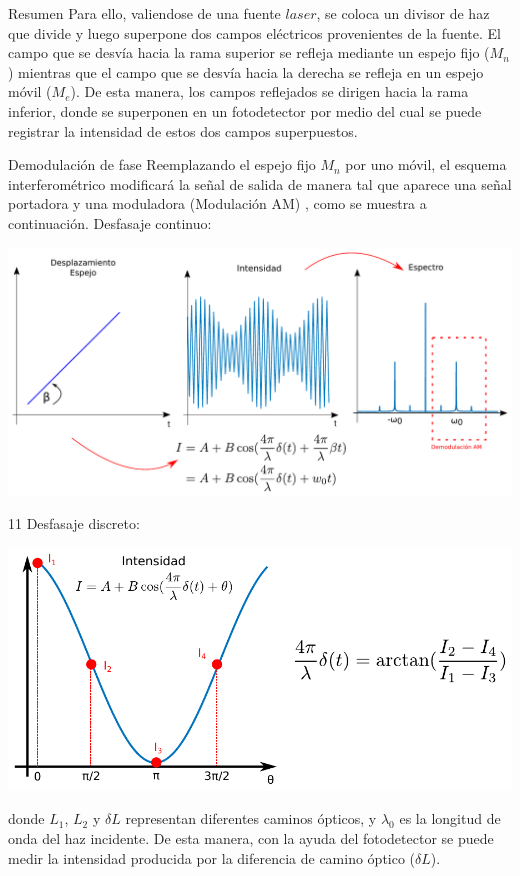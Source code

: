 \documentclass[mathserif]{beamer} %
\begin{document}
\begin{frame}
\begin{columns}[T]
\begin{column}{.475\linewidth}
\begin{block}{Resumen}
Para ello, valiendose de una fuente $laser$, se coloca un divisor de haz que divide y luego superpone dos campos eléctricos provenientes de la fuente. El campo que se desvía hacia la rama superior se refleja mediante un espejo fijo ($M_n$) mientras que el campo que se desvía hacia la derecha se refleja en un espejo móvil ($M_e$). De esta manera, los campos reflejados se dirigen hacia la rama inferior, donde se superponen en un fotodetector por medio del cual se puede registrar la intensidad de estos dos campos superpuestos.
      \end{block}
                 \vspace{-2ex}
                \begin{block}{Demodulación de fase}
                \justifying
   Reemplazando el espejo fijo $M_n$ por uno móvil, el esquema interferométrico modificará la señal de salida de manera tal que aparece una señal portadora y una moduladora (Modulación AM) , como se muestra a continuación.
Desfasaje continuo:
                      \begin{center}
                        \includegraphics[width=0.9\linewidth]{img/desfasaje_continuo.pdf}
                      \end{center}
                   11   \vspace{-1ex}
Desfasaje discreto:
\begin{center}
                        \includegraphics[width=0.9\linewidth]{img/desfasaje_discreto.pdf}
                      \end{center}
                  \justifying
                  donde $L_1$, $L_2$ y $\delta L$ representan diferentes caminos ópticos, y $\lambda_0$ es la longitud de onda del haz incidente. De esta manera, con la ayuda del fotodetector se puede medir la intensidad producida por la diferencia de camino óptico ($\delta L$).
                \end{block} 
                \vspace{-2ex}
                

\end{column}
\end{columns}
\end{frame}
\end{document}
